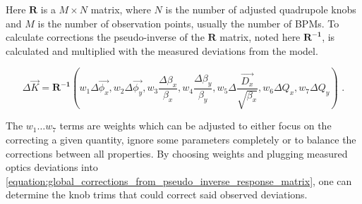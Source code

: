 Here \(\mathbf{R}\) is a \(M \times N\) matrix, where \(N\) is the number of adjusted quadrupole knobs and \(M\) is the number of observation points, usually the number of BPMs.
To calculate corrections the pseudo-inverse of the \(\mathbf{R}\) matrix, noted here \(\mathbf{R^{-1}}\), is calculated and multiplied with the measured deviations from the model.

\begin{equation}
  \Delta \vec{K} = \mathbf{R^{-1}} \left(w_1 \Delta \overrightarrow{\phi_x}, w_2 \Delta \overrightarrow{\phi_y}, w_3 \frac{\Delta \beta_x}{\beta_x}, w_4 \frac{\Delta \beta_y}{\beta_y}, w_5 \Delta \frac{\overrightarrow{D_x}}{\sqrt{\beta_x}}, w_6 \Delta Q_x, w_7 \Delta Q_y \right) \text{ .}
  \label{equation:global_corrections_from_pseudo_inverse_response_matrix}
\end{equation}

The \(w_1 \ldots w_7\) terms are weights which can be adjusted to either focus on the correcting a given quantity, ignore some parameters completely or to balance the corrections between all properties.
By choosing weights and plugging measured optics deviations into \cref{equation:global_corrections_from_pseudo_inverse_response_matrix}, one can determine the knob trims that could correct said observed deviations.

\glsresetall                                     %

